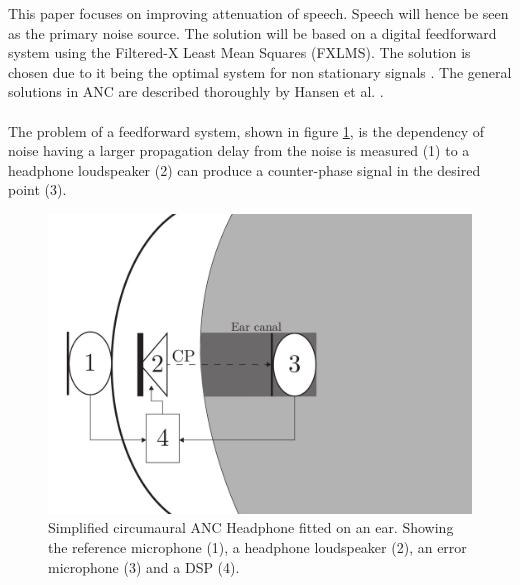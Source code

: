 This paper focuses on improving attenuation of speech. Speech will hence be seen as the primary noise source. The solution will be based on a digital feedforward system using the Filtered-X Least Mean Squares (FXLMS). The solution is chosen due to it being the optimal system for non stationary signals \cite{Hansen2}. The general solutions in ANC are described thoroughly by Hansen et al. \cite{Hansen}.
\\\\
The problem of a feedforward system, shown in figure \ref{fig:SystemOverview}, is the dependency of noise having a larger propagation delay from the noise is measured (1) to a headphone loudspeaker (2) can produce a counter-phase signal in the desired point (3). 

\begin{figure}[H]
	\centering
	\includegraphics[width=1\columnwidth]{figures/ArticleIllustrations/BasicOverviewZoomed}
	\caption{Simplified circumaural ANC Headphone fitted on an ear. Showing the reference microphone (1), a headphone loudspeaker (2), an error microphone (3) and a DSP (4).}
	\label{fig:SystemOverview}
\end{figure}


